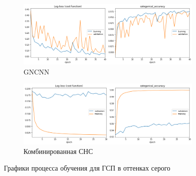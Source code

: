 \begin{figure}[p]
    \centering

    \begin{subfigure}{\textwidth}
        \includegraphics[width=\textwidth]{include/graphics/experimental_plots/grayscale/gncnn_hic}
                    \caption{GNCNN}
    \end{subfigure}

    \begin{subfigure}{\textwidth}
        \includegraphics[width=\textwidth]{include/graphics/experimental_plots/grayscale/mixed_hic}
                    \caption{Комбинированная СНС}
    \end{subfigure}

   \caption{Графики процесса обучения для ГСП в оттенках серого}
    \label{fig:GrayscalePlotsHIC}
\end{figure}

